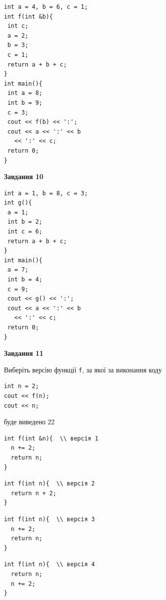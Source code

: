 \documentclass[12pt, ukrainian]{article}
\def\code#1{\Verb!#1!}
\begin{document}
{\begin {large}
\begin{minipage}[t]{7.0cm}
\begin{verbatim}
int a = 4, b = 6, c = 1;
int f(int &b){
 int c;
 a = 2;
 b = 3;
 c = 1;
 return a + b + c;
}
int main(){
 int a = 8;
 int b = 9;
 c = 3;
 cout << f(b) << ':';
 cout << a << ':' << b 
   << ':' << c;
 return 0;
}
\end{verbatim}



\begin{center}
\textbf{Завдання 10}
\end{center}
\vspace{-8mm}

\begin{verbatim}
int a = 1, b = 8, c = 3;
int g(){
 a = 1;
 int b = 2;
 int c = 6;
 return a + b + c;
}
int main(){
 a = 7;
 int b = 4;
 c = 9;
 cout << g() << ':';
 cout << a << ':' << b 
   << ':' << c;
 return 0;
}
\end{verbatim}

\end{minipage}
\vline \hspace{1mm}
\begin{minipage}[t]{11.0cm}

\begin{center}
\textbf{Завдання 11}
\end{center}
Виберіть версію функції \code{f}, за якої за виконання коду
\begin{verbatim}
int n = 2;
cout << f(n);
cout << n;
\end{verbatim}

буде виведено 22

\begin{verbatim}
int f(int &n){  \\ версія 1
  n += 2;
  return n;
}
\end{verbatim}

\vspace{-8mm}\begin{verbatim}
int f(int n){  \\ версія 2
  return n + 2;
}
\end{verbatim}

\vspace{-8mm}\begin{verbatim}
int f(int n){  \\ версія 3
  n += 2;
  return n;
}
\end{verbatim}

\vspace{-8mm}\begin{verbatim}
int f(int n){  \\ версія 4
  return n;
  n += 2;
}
\end{verbatim}




\end{minipage}
\end{large}}
\end{document}
